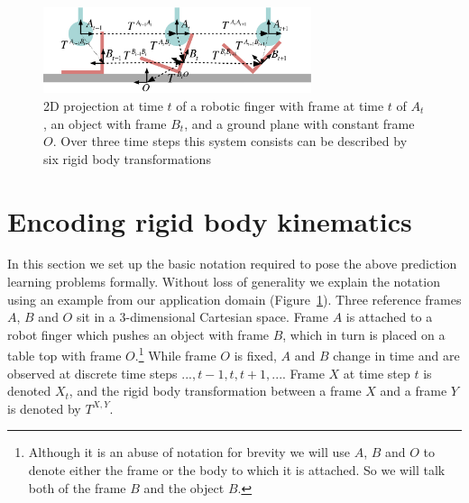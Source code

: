 \begin{figure}[t!]
\centerline{\includegraphics[width=0.7\textwidth]{sequential-frames}
}
\caption[Setup1]{2D projection at time $t$ of a robotic finger with frame at time $t$ of $A_{t}$,
an object with frame $B_{t}$, and a ground plane with constant frame
$O$. Over three time steps this system consists can be described by six rigid body transformations %
}
\label{fig:Learning.setup1}
\end{figure}

\section{Encoding rigid body kinematics}
\label{sec:Representations}

In this section we set up the basic notation required to pose the
above prediction learning problems formally. Without loss of generality we explain the notation using an example from our application domain
(Figure~\ref{fig:Learning.setup1}). Three reference frames $A$, $B$
and $O$ sit in a $3$\nobreakdash-\hspace{0pt}dimensional Cartesian
space. Frame $A$ is attached to a robot finger which pushes an object with frame $B$, which in turn is placed on a table top with frame
$O$.\footnote{Although it is an abuse of notation for brevity we will
  use $A$, $B$ and $O$ to denote either the frame or the body to which  it is attached. So we will talk both of the frame $B$ and the object $B$.} While frame $O$ is fixed, $A$ and $B$ change in time and are observed at discrete time steps $..., t-1, t, t+1, ...$.  Frame $X$ at
time step $t$ is denoted $X_t$, and the rigid body transformation
between a frame $X$ and a frame $Y$ is denoted by $T^{X, Y}$.

